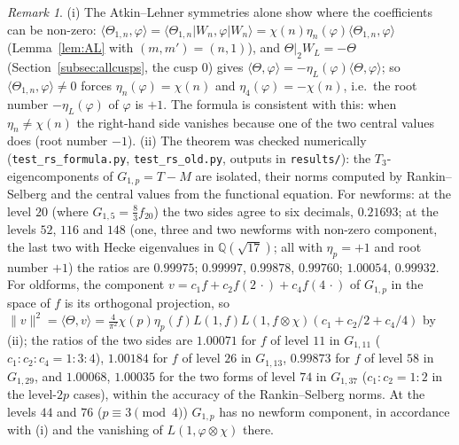 ﻿\documentclass[11pt]{amsart}
\theoremstyle{remark}
\newtheorem{remark}[theorem]{Remark}
\begin{document}
\begin{remark}\label{rem:RSsym}
(i) The Atkin--Lehner symmetries alone show where the coefficients can be non-zero: $\langle\Theta_{1,n},\varphi\rangle=\langle\Theta_{1,n}|W_n,\varphi|W_n\rangle=\chi(n)\eta_n(\varphi)\langle\Theta_{1,n},\varphi\rangle$ (Lemma~\ref{lem:AL} with $(m,m')=(n,1)$), and $\Theta|_2W_L=-\Theta$ (Section~\ref{subsec:allcusps}, the cusp $0$) gives $\langle\Theta,\varphi\rangle=-\eta_L(\varphi)\langle\Theta,\varphi\rangle$; so $\langle\Theta_{1,n},\varphi\rangle\ne0$ forces $\eta_n(\varphi)=\chi(n)$ and $\eta_4(\varphi)=-\chi(n)$, i.e.\ the root number $-\eta_L(\varphi)$ of $\varphi$ is $+1$. The formula is consistent with this: when $\eta_n\ne\chi(n)$ the right-hand side vanishes because one of the two central values does (root number $-1$).
(ii) The theorem was checked numerically (\texttt{test\_rs\_formula.py}, \texttt{test\_rs\_old.py}, outputs in \texttt{results/}): the $T_3$-eigencomponents of $G_{1,p}=T-M$ are isolated, their norms computed by Rankin--Selberg and the central values from the functional equation. For newforms: at the level $20$ (where $G_{1,5}=\frac83f_{20}$) the two sides agree to six decimals, $0.21693$; at the levels $52$, $116$ and $148$ (one, three and two newforms with non-zero component, the last two with Hecke eigenvalues in $\mathbb Q(\sqrt{17})$; all with $\eta_p=+1$ and root number $+1$) the ratios are $0.99975$; $0.99997$, $0.99878$, $0.99760$; $1.00054$, $0.99932$. For oldforms, the component $v=c_1f+c_2f(2\,\cdot)+c_4f(4\,\cdot)$ of $G_{1,p}$ in the space of $f$ is its orthogonal projection, so $\|v\|^2=\langle\Theta,v\rangle=\frac4{\pi^2}\chi(p)\eta_p(f)L(1,f)L(1,f\otimes\chi)(c_1+c_2/2+c_4/4)$ by (ii); the ratios of the two sides are $1.00071$ for $f$ of level $11$ in $G_{1,11}$ ($c_1:c_2:c_4=1:3:4$), $1.00184$ for $f$ of level $26$ in $G_{1,13}$, $0.99873$ for $f$ of level $58$ in $G_{1,29}$, and $1.00068$, $1.00035$ for the two forms of level $74$ in $G_{1,37}$ ($c_1:c_2=1:2$ in the level-$2p$ cases), within the accuracy of the Rankin--Selberg norms. At the levels $44$ and $76$ ($p\equiv3\pmod4$) $G_{1,p}$ has no newform component, in accordance with (i) and the vanishing of $L(1,\varphi\otimes\chi)$ there.
\end{remark}
\end{document}
